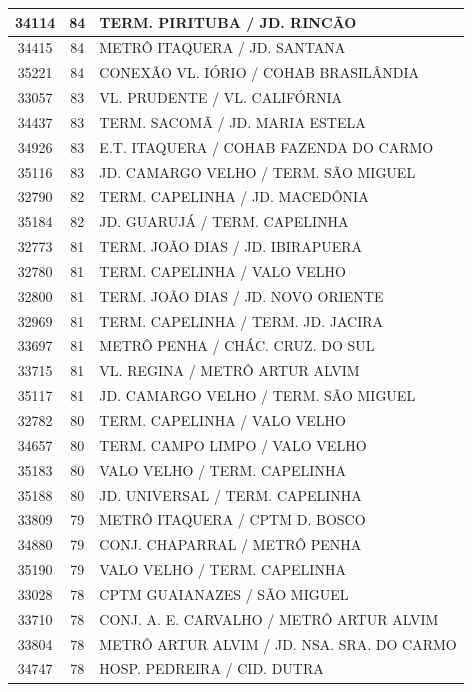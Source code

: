 \documentclass[
	12pt,				%
	oneside,			%
	a4paper,			%
	english,			%
	brazil				%
	]{abntex2ppgsi}
\begin{document}
{{\begin{apendicesenv}
\begin{longtable}{c|c|p{7cm}}
 \hline 
34114 &	84 &	TERM. PIRITUBA / JD. RINCÃO \\ 
 \hline 
34415 &	84 &	METRÔ ITAQUERA / JD. SANTANA \\ 
 \hline 
35221 &	84 &	CONEXÃO VL. IÓRIO / COHAB BRASILÂNDIA \\ 
 \hline 
33057 &	83 &	VL. PRUDENTE / VL. CALIFÓRNIA \\ 
 \hline 
34437 &	83 &	TERM. SACOMÃ / JD. MARIA ESTELA \\ 
 \hline 
34926 &	83 &	E.T. ITAQUERA / COHAB FAZENDA DO CARMO \\ 
 \hline 
35116 &	83 &	JD. CAMARGO VELHO / TERM. SÃO MIGUEL \\ 
 \hline 
32790 &	82 &	TERM. CAPELINHA / JD. MACEDÔNIA \\ 
 \hline 
35184 &	82 &	JD. GUARUJÁ / TERM. CAPELINHA \\ 
 \hline 
32773 &	81 &	TERM. JOÃO DIAS / JD. IBIRAPUERA \\ 
 \hline 
32780 &	81 &	TERM. CAPELINHA / VALO VELHO \\ 
 \hline 
32800 &	81 &	TERM. JOÃO DIAS / JD. NOVO ORIENTE \\ 
 \hline 
32969 &	81 &	TERM. CAPELINHA / TERM. JD. JACIRA \\ 
 \hline 
33697 &	81 &	METRÔ PENHA / CHÁC. CRUZ. DO SUL \\ 
 \hline 
33715 &	81 &	VL. REGINA / METRÔ ARTUR ALVIM \\ 
 \hline 
35117 &	81 &	JD. CAMARGO VELHO / TERM. SÃO MIGUEL \\ 
 \hline 
32782 &	80 &	TERM. CAPELINHA / VALO VELHO \\ 
 \hline 
34657 &	80 &	TERM. CAMPO LIMPO / VALO VELHO \\ 
 \hline 
35183 &	80 &	VALO VELHO / TERM. CAPELINHA \\ 
 \hline 
35188 &	80 &	JD. UNIVERSAL / TERM. CAPELINHA \\ 
 \hline 
33809 &	79 &	METRÔ ITAQUERA / CPTM D. BOSCO \\ 
 \hline 
34880 &	79 &	CONJ. CHAPARRAL / METRÔ PENHA \\ 
 \hline 
35190 &	79 &	VALO VELHO / TERM. CAPELINHA \\ 
 \hline 
33028 &	78 &	CPTM GUAIANAZES / SÃO MIGUEL \\ 
 \hline 
33710 &	78 &	CONJ. A. E. CARVALHO / METRÔ ARTUR ALVIM \\ 
 \hline 
33804 &	78 &	METRÔ ARTUR ALVIM / JD. NSA. SRA. DO CARMO \\ 
 \hline 
34747 &	78 &	HOSP. PEDREIRA / CID. DUTRA \\ 

\end{longtable}
\end{apendicesenv}}}
\end{document}
